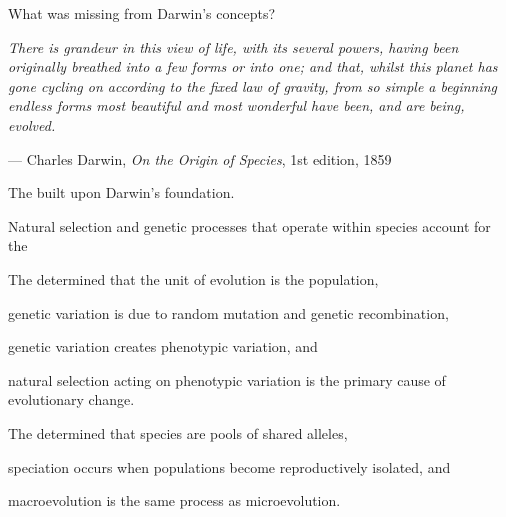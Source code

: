 \documentclass[t]{beamer}
\begin{document}

\begin{frame}[t]{What was missing from Darwin's concepts?}
\vspace{-\baselineskip}
\begin{multicols*}{2}
\bigskip


\vfilll

\columnbreak

\noindent\textit{There is grandeur in this view of life, with its several powers, having been originally breathed into a few forms or into one; and that, whilst this planet has gone cycling on according to the fixed law of gravity, from so simple a beginning endless forms most beautiful and most wonderful have been, and are being, evolved.}

\vspace{0.5em}

— Charles Darwin, \textit{On the Origin of Species}, 1st edition, 1859

\end{multicols*}
\end{frame}

\begin{frame}{The  built upon Darwin's foundation.}

\hangpara Natural selection and genetic processes that operate within species account for the 

\end{frame}

\begin{frame}[t]{The  determined that}
\hangpara the unit of evolution is the population,

\hangpara genetic variation is due to random mutation and genetic recombination,

\hangpara genetic variation creates phenotypic variation, and

\hangpara natural selection acting on phenotypic variation is the primary cause of evolutionary change.

\end{frame}

\begin{frame}[t]{The  determined that}
\hangpara species are pools of shared alleles, 

\hangpara speciation occurs when populations become reproductively isolated, and

\hangpara macroevolution is the same process as microevolution.


\end{frame}
\end{document}
